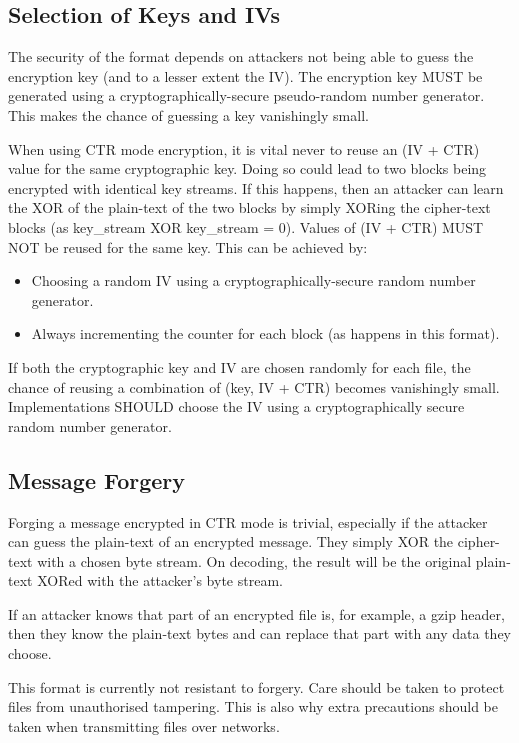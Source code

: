 \documentclass[10pt]{article}
\begin{document}
{\subsection{Selection of Keys and IVs}
The security of the format depends on attackers not being able to guess the encryption key (and to a lesser extent the
IV).
The encryption key MUST be generated using a cryptographically-secure pseudo-random number generator.
This makes the chance of guessing a key vanishingly small.

When using CTR mode encryption, it is vital never to reuse an (IV + CTR) value for the same cryptographic key.
Doing so could lead to two blocks being encrypted with identical key streams.
If this happens, then an attacker can learn the XOR of the plain-text of the two blocks by simply XORing the cipher-text
blocks (as key\_stream XOR key\_stream = 0).
Values of (IV + CTR) MUST NOT be reused for the same key.
This can be achieved by:

\begin{itemize}
\item Choosing a random IV using a cryptographically-secure random number generator.
\item Always incrementing the counter for each block (as happens in this format).
\end{itemize}

If both the cryptographic key and IV are chosen randomly for each file, the chance of reusing a combination of
(key, IV + CTR) becomes vanishingly small.
Implementations SHOULD choose the IV using a cryptographically secure random number generator.

\subsection{Message Forgery}
Forging a message encrypted in CTR mode is trivial, especially if the attacker can guess the plain-text of an encrypted
message.
They simply XOR the cipher-text with a chosen byte stream.
On decoding, the result will be the original plain-text XORed with the attacker's byte stream.

If an attacker knows that part of an encrypted file is, for example, a gzip header, then they know the plain-text bytes
and can replace that part with any data they choose.

This format is currently not resistant to forgery.
Care should be taken to protect files from unauthorised tampering.
This is also why extra precautions should be taken when transmitting files over networks.

}
\end{document}
